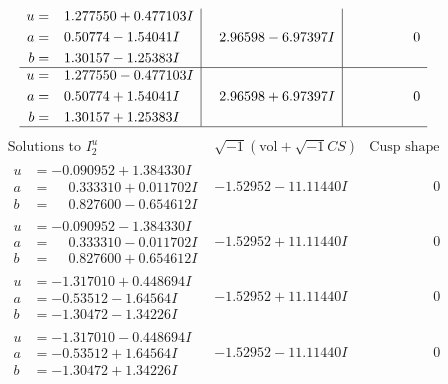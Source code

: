 \documentclass[1p]{elsarticle_modified}
\theoremstyle{definition}
\newcommand{\I}{\sqrt{-1}}
\begin{document}
$$\begin{array}{c|c|c}
\begin{aligned}
u &= \phantom{-}1.277550 + 0.477103 I \\
a &= \phantom{-}0.50774 - 1.54041 I \\
b &= \phantom{-}1.30157 - 1.25383 I\end{aligned}
 & \phantom{-}2.96598 - 6.97397 I & \phantom{-0.000000 } 0 \\ \hline\begin{aligned}
u &= \phantom{-}1.277550 - 0.477103 I \\
a &= \phantom{-}0.50774 + 1.54041 I \\
b &= \phantom{-}1.30157 + 1.25383 I\end{aligned}
 & \phantom{-}2.96598 + 6.97397 I & \phantom{-0.000000 } 0\\
 \hline 
 \end{array}$$\newpage$$\begin{array}{c|c|c}  
\text{Solutions to }I^u_{2}& \I (\text{vol} + \sqrt{-1}CS) & \text{Cusp shape}\\
 \hline 
\begin{aligned}
u &= -0.090952 + 1.384330 I \\
a &= \phantom{-}0.333310 + 0.011702 I \\
b &= \phantom{-}0.827600 - 0.654612 I\end{aligned}
 & -1.52952 - 11.11440 I & \phantom{-0.000000 } 0 \\ \hline\begin{aligned}
u &= -0.090952 - 1.384330 I \\
a &= \phantom{-}0.333310 - 0.011702 I \\
b &= \phantom{-}0.827600 + 0.654612 I\end{aligned}
 & -1.52952 + 11.11440 I & \phantom{-0.000000 } 0 \\ \hline\begin{aligned}
u &= -1.317010 + 0.448694 I \\
a &= -0.53512 - 1.64564 I \\
b &= -1.30472 - 1.34226 I\end{aligned}
 & -1.52952 + 11.11440 I & \phantom{-0.000000 } 0 \\ \hline\begin{aligned}
u &= -1.317010 - 0.448694 I \\
a &= -0.53512 + 1.64564 I \\
b &= -1.30472 + 1.34226 I\end{aligned}
 & -1.52952 - 11.11440 I & \phantom{-0.000000 } 0 \\ \hline\begin{aligned}

\end{aligned}
\end{array}$$
\end{document}
